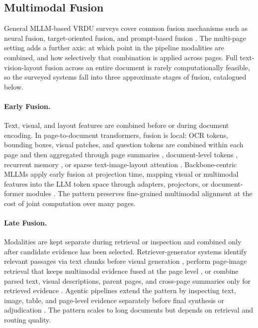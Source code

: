 \documentclass[11pt]{article}
\begin{document}
\subsection{Multimodal Fusion}
\label{app:fusion}
General MLLM-based VRDU surveys cover common fusion mechanisms such as neural fusion, target-oriented fusion, and prompt-based fusion \cite{ding2025survey}. The multi-page setting adds a further axis: at which point in the pipeline modalities are combined, and how selectively that combination is applied across pages. Full text-vision-layout fusion across an entire document is rarely computationally feasible, so the surveyed systems fall into three approximate stages of fusion, catalogued below.

\paragraph{Early Fusion.}
Text, visual, and layout features are combined before or during document encoding. In page-to-document transformers, fusion is local: OCR tokens, bounding boxes, visual patches, and question tokens are combined within each page and then aggregated through page summaries \cite{tito2023hierarchical}, document-level tokens \cite{blau2024gram}, recurrent memory \cite{dong2024multi}, or sparse text-image-layout attention \cite{borchmann2025arctic}. Backbone-centric MLLMs apply early fusion at projection time, mapping visual or multimodal features into the LLM token space through adapters, projectors, or document-former modules \cite{tanaka2024instructdoc, duan2025docopilot, jia2024leopard}. The pattern preserves fine-grained multimodal alignment at the cost of joint computation over many pages.

\paragraph{Late Fusion.}
Modalities are kept separate during retrieval or inspection and combined only after candidate evidence has been selected. Retriever-generator systems identify relevant passages via text chunks before visual generation \cite{zhang2024cream}, perform page-image retrieval that keeps multimodal evidence fused at the page level \cite{cho2024m3docrag}, or combine parsed text, visual descriptions, parent pages, and cross-page summaries only for retrieved evidence \cite{gong2025mhier}. Agentic pipelines extend the pattern by inspecting text, image, table, and page-level evidence separately before final synthesis or adjudication \cite{han2025mdocagent, duan2025m2rag, zhu2025doclens}. The pattern scales to long documents but depends on retrieval and routing quality.
\end{document}
